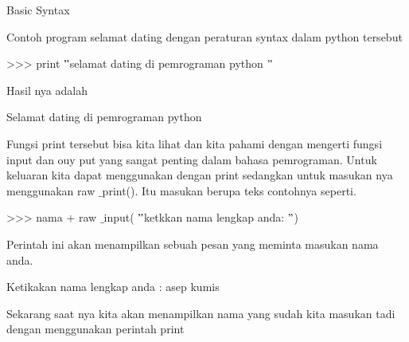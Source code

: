 \documentclass[a4paper,12pt]{report}
\begin{document}
\sloppy
{\fontsize{14pt}{14pt}\selectfont \vspace{\baselineskip}
Basic Syntax \\} \par
\vspace{14pt}
\noindent 
{\fontsize{14pt}{14pt}\selectfont Contoh program selamat dating dengan peraturan syntax dalam python tersebut  \\} \par
\vspace{14pt}
\noindent 
{\fontsize{14pt}{14pt}\selectfont >>> print  $ " $selamat dating di pemrograman python $ " $ \\} \par
\vspace{14pt}
\noindent 
{\fontsize{14pt}{14pt}\selectfont Hasil nya adalah  \\} \par
\vspace{14pt}
\noindent 
{\fontsize{14pt}{14pt}\selectfont Selamat dating di pemrograman python  \\} \par
\vspace{14pt}
\noindent 
{\fontsize{14pt}{14pt}\selectfont Fungsi print tersebut bisa kita lihat dan kita pahami dengan mengerti fungsi input dan ouy put yang sangat penting dalam bahasa pemrograman. Untuk keluaran kita dapat menggunakan dengan print sedangkan untuk masukan nya menggunakan raw $  \_  $print(). Itu masukan berupa teks contohnya seperti. \\} \par
\vspace{14pt}
\noindent 
{\fontsize{14pt}{14pt}\selectfont >>> nama + raw $  \_  $input( $ " $ketkkan nama lengkap anda: $ " $) \\} \par
\vspace{14pt}
\noindent 
{\fontsize{14pt}{14pt}\selectfont Perintah ini akan menampilkan sebuah pesan yang meminta masukan nama anda. \\} \par
\vspace{14pt}
\noindent 
{\fontsize{14pt}{14pt}\selectfont Ketikakan nama lengkap anda : asep kumis \\} \par
\vspace{14pt}
\noindent 
{\fontsize{14pt}{14pt}\selectfont Sekarang saat nya kita akan menampilkan nama yang sudah kita masukan tadi dengan menggunakan perintah print \\} \par
\end{document}
